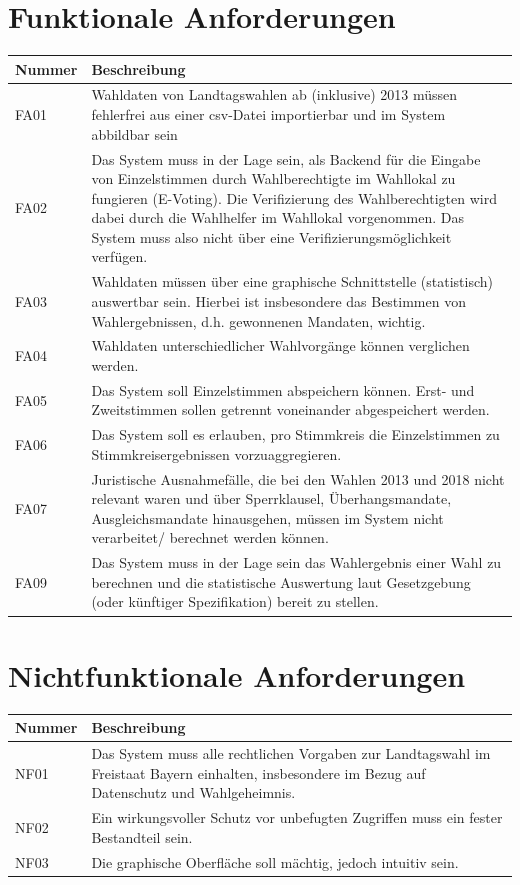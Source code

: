 \documentclass[a4paper,12pt]{article}
\newcommand\addrow[2]{#1 &#2\\ }
\newcommand\addheading[2]{#1 &#2\\ \hline}
\newcommand\tabularhead{\begin{tabular}{lp{13cm}}
\hline
}
\newenvironment{usecase}{\tabularhead}
{\hline\end{tabular}}
\begin{document}
\section{Funktionale Anforderungen}
\begin{usecase}
  \addheading{Nummer}{Beschreibung} 
  \addrow{FA01}{Wahldaten von Landtagswahlen ab (inklusive) 2013 müssen fehlerfrei aus einer csv-Datei importierbar und im System abbildbar sein}
  \addrow{FA02}{Das System muss in der Lage sein, als Backend für die Eingabe von Einzelstimmen durch Wahlberechtigte im Wahllokal zu fungieren (E-Voting). Die Verifizierung des Wahlberechtigten wird dabei durch die Wahlhelfer im Wahllokal vorgenommen. Das System muss also nicht über eine Verifizierungsmöglichkeit verfügen.}
  \addrow{FA03}{Wahldaten müssen über eine graphische Schnittstelle (statistisch) auswertbar sein. Hierbei ist insbesondere das Bestimmen von
                Wahlergebnissen, d.h. gewonnenen Mandaten, wichtig.}
  \addrow{FA04}{Wahldaten unterschiedlicher Wahlvorgänge können verglichen werden.}
  \addrow{FA05}{Das System soll Einzelstimmen abspeichern können. Erst- und Zweitstimmen sollen getrennt voneinander abgespeichert werden.}
  \addrow{FA06}{Das System soll es erlauben, pro Stimmkreis die Einzelstimmen zu Stimmkreisergebnissen vorzuaggregieren.}
  \addrow{FA07}{Juristische Ausnahmefälle, die bei den Wahlen 2013 und 2018 nicht relevant waren und über Sperrklausel, Überhangsmandate, Ausgleichsmandate hinausgehen, müssen im System nicht verarbeitet/ berechnet werden können.}
  \addrow{FA09}{Das System muss in der Lage sein das Wahlergebnis einer Wahl zu berechnen und die statistische Auswertung laut Gesetzgebung (oder künftiger Spezifikation) bereit zu stellen.}
  
\end{usecase}

\section{Nichtfunktionale Anforderungen}
\begin{usecase}
  \addheading{Nummer}{Beschreibung} 
  \addrow{NF01}{Das System muss alle rechtlichen Vorgaben zur Landtagswahl im Freistaat Bayern einhalten, insbesondere im Bezug auf Datenschutz und Wahlgeheimnis.}
  \addrow{NF02}{Ein wirkungsvoller Schutz vor unbefugten Zugriffen muss ein fester Bestandteil sein.}
  \addrow{NF03}{Die graphische Oberfläche soll mächtig, jedoch intuitiv sein.}
\end{usecase}
\end{document}
